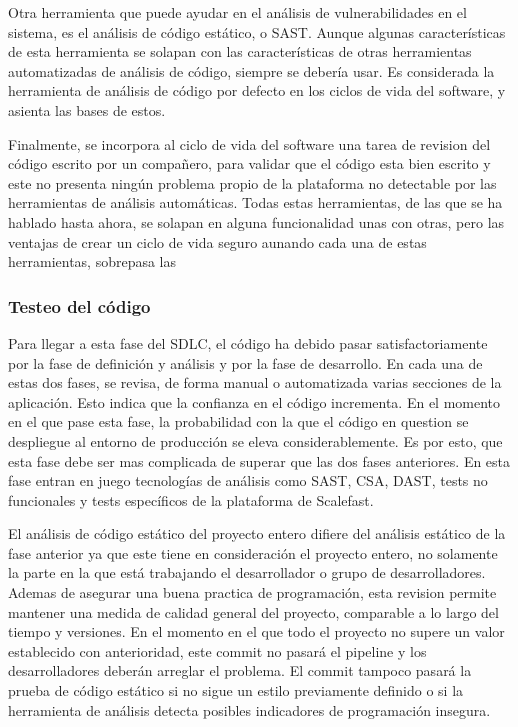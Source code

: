 \documentclass[12pt]{report} %
\begin{document}
Otra herramienta que puede ayudar en el análisis de vulnerabilidades en el
sistema, es el análisis de código estático, o \gls{SAST}.  Aunque algunas
características de esta herramienta se solapan con las características de otras
herramientas automatizadas de análisis de código, siempre se debería usar.  Es
considerada la herramienta de análisis de código por defecto en los ciclos de
vida del software, y asienta las bases de estos.

Finalmente, se incorpora al ciclo de vida del software una tarea de revision del
código escrito por un compañero, para validar que el código esta bien escrito y
este no presenta ningún problema propio de la plataforma no detectable por las
herramientas de análisis automáticas. Todas estas herramientas, de las que se ha
hablado hasta ahora, se solapan en alguna funcionalidad unas con otras, pero las
ventajas de crear un ciclo de vida seguro aunando cada una de estas
herramientas, sobrepasa las 


\subsubsection{Testeo del código} \label{testeodecodigo}

Para llegar a esta fase del \gls{SDLC}, el código ha debido pasar
satisfactoriamente por la fase de definición y análisis y por la fase de
desarrollo.  En cada una de estas dos fases, se revisa, de forma manual o
automatizada varias secciones de la aplicación.  Esto indica que la confianza en
el código incrementa.  En el momento en el que pase esta fase, la probabilidad
con la que el código en question se despliegue al entorno de producción se eleva
considerablemente.  Es por esto, que esta fase debe ser mas complicada de
superar que las dos fases anteriores.  En esta fase entran en juego tecnologías
de análisis como \gls{SAST}, \gls{CSA}, \gls{DAST}, tests no funcionales y tests
específicos de la plataforma de Scalefast.

El análisis de código estático del proyecto entero difiere del análisis estático
de la fase anterior ya que este tiene en consideración el proyecto entero, no
solamente la parte en la que está trabajando el desarrollador o grupo de
desarrolladores.  Ademas de asegurar una buena practica de programación, esta
revision permite mantener una medida de calidad general del proyecto, comparable
a lo largo del tiempo y versiones.  En el momento en el que todo el proyecto no
supere un valor establecido con anterioridad, este commit no pasará el
\gls{pipeline} y los desarrolladores deberán arreglar el problema.  El commit
tampoco pasará la prueba de código estático si no sigue un estilo previamente
definido o si la herramienta de análisis detecta posibles indicadores de
programación insegura.
\end{document}
